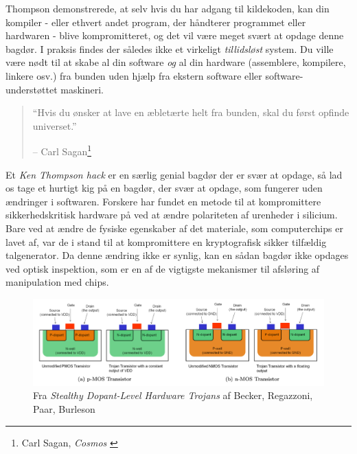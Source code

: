 \documentclass[paper=6in:9in,pagesize=pdftex,headinclude=on,footinclude=on,12pt]{scrbook}
\begin{document}
Thompson demonstrerede, at selv hvis du har adgang til kildekoden, kan din kompiler - eller ethvert andet program, der håndterer programmet eller hardwaren - blive kompromitteret, og det vil være meget svært at opdage denne bagdør. I praksis findes der således ikke et virkeligt \textit{tillidsløst} system. Du ville være nødt til at skabe al din software \textit{og} al din hardware (assemblere, kompilere, linkere osv.) fra bunden uden hjælp fra ekstern software eller software-understøttet maskineri.\begin{quotation}\begin{samepage} \enquote{Hvis du ønsker at lave en æbletærte helt fra bunden, skal du først opfinde universet.} \begin{flushright} -- Carl Sagan\footnote{Carl Sagan, \textit{Cosmos} \cite{cosmos}}
\end{flushright}\end{samepage}\end{quotation}

Et \textit{Ken Thompson hack} er en særlig genial bagdør der er svær at opdage, så lad os tage et hurtigt kig på en bagdør, der svær at opdage, som fungerer uden ændringer i softwaren. Forskere har fundet en metode til at kompromittere sikkerhedskritisk hardware på ved at ændre polariteten af urenheder i silicium.~\cite{becker2013stealthy} Bare ved at ændre de fysiske egenskaber af det materiale, som computerchips er lavet af, var de i stand til at kompromittere en kryptografisk sikker tilfældig talgenerator. Da denne ændring ikke er synlig, kan en sådan bagdør ikke opdages ved optisk inspektion, som er en af de vigtigste mekanismer til afsløring af manipulation med chips.\begin{figure}
  \includegraphics{assets/images/stealthy-hardware-trojan.png}
  \caption{Fra \textit{Stealthy Dopant-Level Hardware Trojans} af Becker, Regazzoni, Paar, Burleson}
  \label{fig:stealthy-hardware-trojan}
\end{figure}
\end{document}
